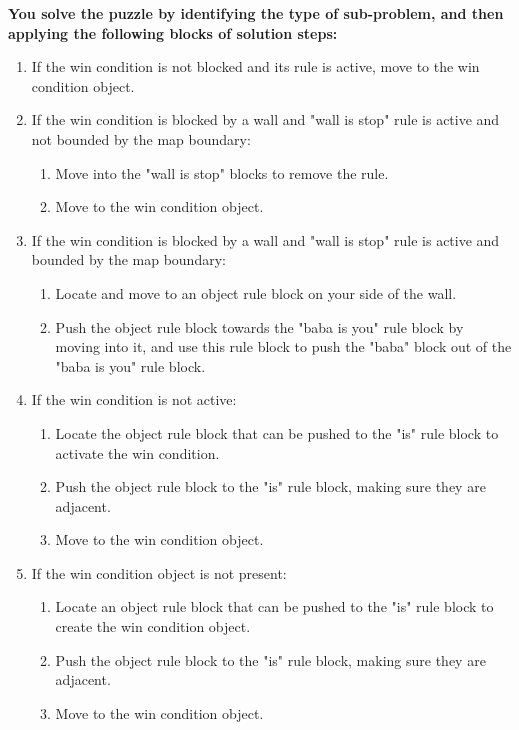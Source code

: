 \begin{GreenBox}[frametitle={\textbf{Iteration 3 Baba-is-ai Prompt}}]
\textbf{You solve the puzzle by identifying the type of sub-problem, and then applying the following blocks of solution steps:}
\begin{enumerate}
    \item If the win condition is not blocked and its rule is active, move to the win condition object.
    \item If the win condition is blocked by a wall and "wall is stop" rule is active and not bounded by the map boundary:
    \begin{enumerate}
        \item Move into the "wall is stop" blocks to remove the rule.
        \item Move to the win condition object.
    \end{enumerate}
    \item If the win condition is blocked by a wall and "wall is stop" rule is active and bounded by the map boundary:
    \begin{enumerate}
        \item Locate and move to an object rule block on your side of the wall.
        \item Push the object rule block towards the "baba is you" rule block by moving into it, and use this rule block to push the "baba" block out of the "baba is you" rule block.
    \end{enumerate}
    \item If the win condition is not active:
    \begin{enumerate}
        \item Locate the object rule block that can be pushed to the "is" rule block to activate the win condition.
        \item Push the object rule block to the "is" rule block, making sure they are adjacent.
        \item Move to the win condition object.
    \end{enumerate}
    \item If the win condition object is not present:
    \begin{enumerate}
        \item Locate an object rule block that can be pushed to the "is" rule block to create the win condition object.
        \item Push the object rule block to the "is" rule block, making sure they are adjacent.
        \item Move to the win condition object.
    \end{enumerate}
\end{enumerate}


\end{GreenBox}
